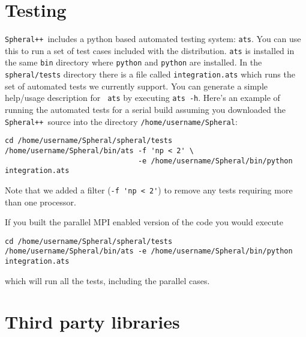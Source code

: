\documentclass{article}
\newcommand{\Spheral}{{\tt Spheral++}}
\begin{document}
\section{Testing}
\Spheral\ includes a python based automated testing system: \verb+ats+.  You
can use this to run a set of test cases included with the distribution.
\verb+ats+ is installed in the same \verb+bin+ directory where \verb+python+
and \verb+python+ are installed.  In the \verb+spheral/tests+ directory there is
a file called \verb+integration.ats+ which runs the set of automated tests we
currently support.  You can generate a simple help/usage description for {\tt
  ats} by executing \verb+ats -h+.  Here's an example of running the automated
tests for a serial build assuming you downloaded the \Spheral\ source into the
directory \verb+/home/username/Spheral+:
\begin{verbatim}
cd /home/username/Spheral/spheral/tests
/home/username/Spheral/bin/ats -f 'np < 2' \
                               -e /home/username/Spheral/bin/python integration.ats
\end{verbatim}
Note that we added a filter (\verb+-f 'np < 2'+) to remove any tests requiring
more than one processor.

If you built the parallel MPI enabled version of the code you would execute
\begin{verbatim}
cd /home/username/Spheral/spheral/tests
/home/username/Spheral/bin/ats -e /home/username/Spheral/bin/python integration.ats
\end{verbatim}
which will run all the tests, including the parallel cases.

\appendix
\section{Third party libraries}
\label{thirdParty.sec}
\end{document}
